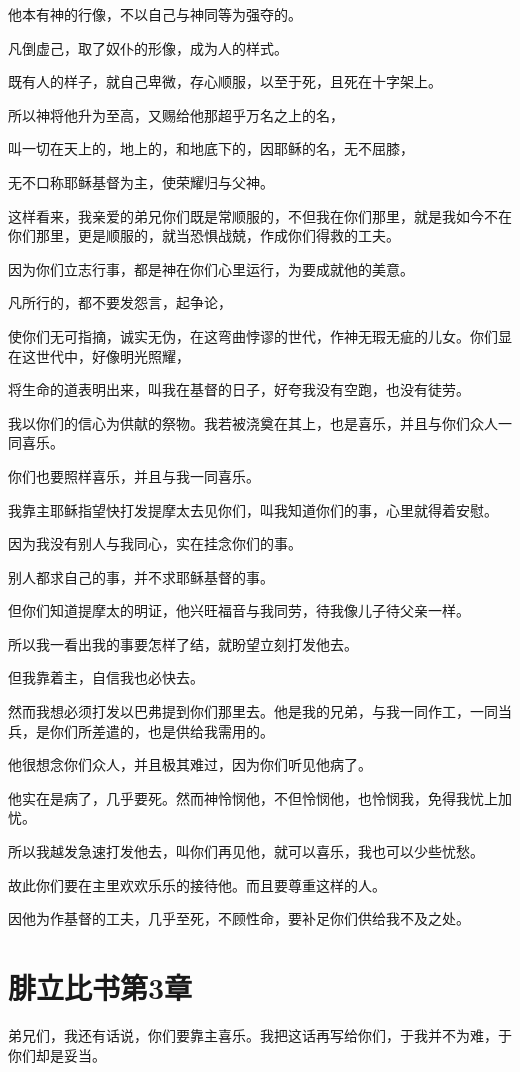 \documentclass[12pt,oneside]{book}
\begin{document}
他本有神的行像，不以自己与神同等为强夺的。

凡倒虚己，取了奴仆的形像，成为人的样式。

既有人的样子，就自己卑微，存心顺服，以至于死，且死在十字架上。

所以神将他升为至高，又赐给他那超乎万名之上的名，

叫一切在天上的，地上的，和地底下的，因耶稣的名，无不屈膝，

无不口称耶稣基督为主，使荣耀归与父神。

这样看来，我亲爱的弟兄你们既是常顺服的，不但我在你们那里，就是我如今不在你们那里，更是顺服的，就当恐惧战兢，作成你们得救的工夫。

因为你们立志行事，都是神在你们心里运行，为要成就他的美意。

凡所行的，都不要发怨言，起争论，

使你们无可指摘，诚实无伪，在这弯曲悖谬的世代，作神无瑕无疵的儿女。你们显在这世代中，好像明光照耀，

将生命的道表明出来，叫我在基督的日子，好夸我没有空跑，也没有徒劳。

我以你们的信心为供献的祭物。我若被浇奠在其上，也是喜乐，并且与你们众人一同喜乐。

你们也要照样喜乐，并且与我一同喜乐。

我靠主耶稣指望快打发提摩太去见你们，叫我知道你们的事，心里就得着安慰。

因为我没有别人与我同心，实在挂念你们的事。

别人都求自己的事，并不求耶稣基督的事。

但你们知道提摩太的明证，他兴旺福音与我同劳，待我像儿子待父亲一样。

所以我一看出我的事要怎样了结，就盼望立刻打发他去。

但我靠着主，自信我也必快去。

然而我想必须打发以巴弗提到你们那里去。他是我的兄弟，与我一同作工，一同当兵，是你们所差遣的，也是供给我需用的。

他很想念你们众人，并且极其难过，因为你们听见他病了。

他实在是病了，几乎要死。然而神怜悯他，不但怜悯他，也怜悯我，免得我忧上加忧。

所以我越发急速打发他去，叫你们再见他，就可以喜乐，我也可以少些忧愁。

故此你们要在主里欢欢乐乐的接待他。而且要尊重这样的人。

因他为作基督的工夫，几乎至死，不顾性命，要补足你们供给我不及之处。

\chapter{腓立比书第3章}
弟兄们，我还有话说，你们要靠主喜乐。我把这话再写给你们，于我并不为难，于你们却是妥当。
\end{document}

